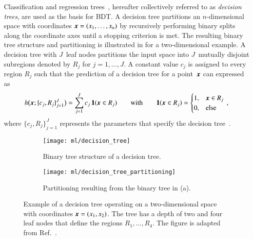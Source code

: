 Classification and regression trees~\cite{Breiman:1984jka,hastie09}, hereafter
collectively referred to as \emph{decision trees}, are used as the basis for
BDT. A decision tree partitions an $n$-dimensional space with coordinates
$\myvec{x} = (x_1, \dots, x_n)$ by recursively performing binary splits along
the coordinate axes until a stopping criterion is met. The resulting binary tree
structure and partitioning is illustrated in  for a
two-dimensional example. A decision tree with $J$~leaf nodes partitions the
input space into $J$~mutually disjoint subregions denoted by $R_j$ for
$j = 1, \dots, J$. A constant value $c_j$ is assigned to every region $R_j$ such
that the prediction of a decision tree for a point~$\myvec{x}$ can expressed as
\begin{align*}
  h\bigl( \myvec{x}; \{c_j, R_j\}_{j=1}^{J} \bigr) = \sum_{j = 1}^{J} c_j \, \mathbf{1}(\myvec{x} \in R_j) \qquad \text{with} \qquad \mathbf{1}(\myvec{x} \in R_j) =
  \begin{cases}
    1, & \myvec{x} \in R_j \\
    0, & \text{else}
  \end{cases} \,\text{,}
\end{align*}
where $\{c_j, R_j\}_{j=1}^{J}$ represents the parameters that specify the
decision tree~\cite{hastie09}.

\begin{figure}[htbp]
  \centering

  \begin{subfigure}[b]{0.46\textwidth}
    \centering
    \texttt{[image: ml/decision\_tree]}
    \caption{Binary tree structure of a decision tree.}
  \end{subfigure}\hfill%
  \begin{subfigure}[b]{0.46\textwidth}
    \centering
    \texttt{[image: ml/decision\_tree\_partitioning]}
    \vspace*{0.7em}
    \caption{Partitioning resulting from the binary tree in (a).}
  \end{subfigure}\hfill%

  \caption{Example of a decision tree operating on a two-dimensional space with
    coordinates $\myvec{x} = (x_1, x_2)$. The tree has a depth of two and four
    leaf nodes that define the regions $R_1, \dots, R_4$. The figure is adapted
    from Ref.~\cite{hastie09}.}%
  \label{fig:decision_tree}
\end{figure}

